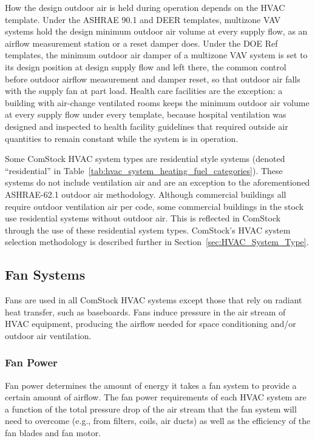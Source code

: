 How the design outdoor air is held during operation depends on the HVAC template. Under the ASHRAE 90.1 and DEER templates, multizone VAV systems hold the design minimum outdoor air volume at every supply flow, as an airflow measurement station or a reset damper does. Under the DOE Ref templates, the minimum outdoor air damper of a multizone VAV system is set to its design position at design supply flow and left there, the common control before outdoor airflow measurement and damper reset, so that outdoor air falls with the supply fan at part load. Health care facilities are the exception: a building with air-change ventilated rooms keeps the minimum outdoor air volume at every supply flow under every template, because hospital ventilation was designed and inspected to health facility guidelines that required outside air quantities to remain constant while the system is in operation.

Some ComStock HVAC system types are residential style systems (denoted ``residential'' in Table~\ref{tab:hvac_system_heating_fuel_categories}). These systems do not include ventilation air and are an exception to the aforementioned ASHRAE-62.1 outdoor air methodology. Although commercial buildings all require outdoor ventilation air per code, some commercial buildings in the stock use residential systems without outdoor air. This is reflected in ComStock through the use of these residential system types. ComStock's HVAC system selection methodology is described further in Section~\ref{sec:HVAC_System_Type}.



\pagebreak
\subsection{Fan Systems}

Fans are used in all ComStock HVAC systems except those that rely on radiant heat transfer, such as baseboards. Fans induce pressure in the air stream of HVAC equipment, producing the airflow needed for space conditioning and/or outdoor air ventilation.

\subsubsection{Fan Power}

Fan power determines the amount of energy it takes a fan system to provide a certain amount of airflow. The fan power requirements of each HVAC system are a function of the total pressure drop of the air stream that the fan system will need to overcome (e.g., from filters, coils, air ducts) as well as the efficiency of the fan blades and fan motor.

